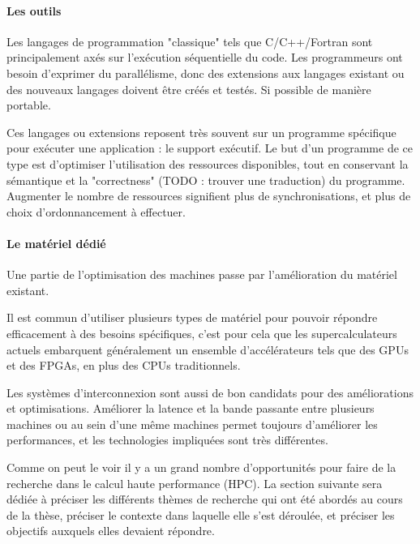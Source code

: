 \paragraph{Les outils}

Les langages de programmation "classique" tels que C/C++/Fortran sont principalement axés sur l'exécution séquentielle du code.
Les programmeurs ont besoin d'exprimer du parallélisme, donc des extensions aux langages existant ou des nouveaux langages doivent être créés et testés. Si possible de manière portable.

Ces langages ou extensions reposent très souvent sur un programme spécifique pour exécuter une application : le support exécutif.
Le but d'un programme de ce type est d'optimiser l'utilisation des ressources disponibles, tout en conservant la sémantique et la "correctness" (TODO : trouver une traduction) du programme.
Augmenter le nombre de ressources signifient plus de synchronisations, et plus de choix d'ordonnancement à effectuer.

\paragraph{Le matériel dédié}

Une partie de l'optimisation des machines passe par l'amélioration du matériel existant.

Il est commun d'utiliser plusieurs types de matériel pour pouvoir répondre efficacement à des besoins spécifiques, c'est pour cela que les supercalculateurs actuels embarquent généralement un ensemble d'accélérateurs tels que des GPUs et des FPGAs, en plus des CPUs traditionnels.

Les systèmes d'interconnexion sont aussi de bon candidats pour des améliorations et optimisations.
Améliorer la latence et la bande passante entre plusieurs machines ou au sein d'une même machines permet toujours d'améliorer les performances, et les technologies impliquées sont très différentes.



Comme on peut le voir il y a un grand nombre d'opportunités pour faire de la recherche dans le calcul haute performance (HPC).
La section suivante sera dédiée à préciser les différents thèmes de recherche qui ont été abordés au cours de la thèse, préciser le contexte dans laquelle elle s'est déroulée, et préciser les objectifs auxquels elles devaient répondre.





